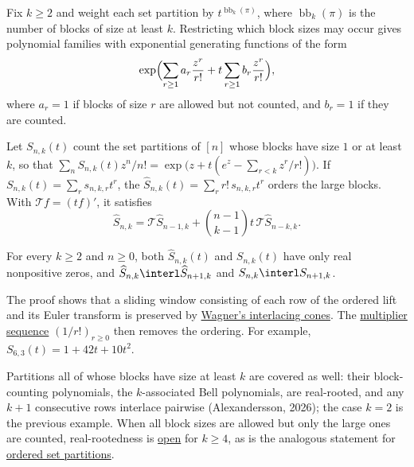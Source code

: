 \begin{example*}\label{bigBlockSetPartitions}
Fix $k\geq2$ and weight each set partition by $t^{\operatorname{bb}_k(\pi)}$, where
$\operatorname{bb}_k(\pi)$ is the number of blocks of size at least $k$.  Restricting which
block sizes may occur gives polynomial families with exponential generating
functions of the form
\[
  \exp\Bigl(\sum_{r\geq1}a_r\frac{z^r}{r!}+t\sum_{r\geq1}b_r\frac{z^r}{r!}\Bigr),
\]
where $a_r=1$ if blocks of size $r$ are allowed but not counted, and $b_r=1$
if they are counted.

Let $S_{n,k}(t)$ count the set partitions of $[n]$ whose blocks have size $1$
or at least $k$, so that
$\sum_n S_{n,k}(t)z^n/n!=\exp\bigl(z+t(e^z-\sum_{r<k}z^r/r!)\bigr)$.  If
$S_{n,k}(t)=\sum_r s_{n,k,r}t^r$, the 
$\widehat S_{n,k}(t)=\sum_r r!\,s_{n,k,r}t^r$ orders the large blocks.
With $\mathcal{T}f=(tf)'$, it satisfies
\[
  \widehat S_{n,k}
  =\mathcal{T}\widehat S_{n-1,k}
  +\binom{n-1}{k-1}t\,\mathcal{T}\widehat S_{n-k,k}.
\]

\begin{theorem}[Alexandersson, 2026]
For every $k\geq2$ and $n\geq0$, both $\widehat S_{n,k}(t)$ and $S_{n,k}(t)$
have only real nonpositive zeros, and
$\widehat S_{n,k}\interl\widehat S_{n+1,k}$ and
$S_{n,k}\interl S_{n+1,k}$.
\end{theorem}

The proof shows that a sliding window consisting of each row of the ordered
lift and its Euler transform is preserved by
\hyperref[interlacingPolynomials]{Wagner's interlacing cones}.  The
\hyperref[multiplierSequences]{multiplier sequence} $(1/r!)_{r\geq0}$ then
removes the ordering.  For example,
$S_{6,3}(t)=1+42t+10t^2$.

Partitions all of whose blocks have size at least $k$ are covered as well:
their block-counting polynomials, the $k$-associated Bell polynomials, are
real-rooted, and any $k+1$ consecutive rows interlace pairwise
(Alexandersson, 2026); the case $k=2$ is the previous example.  When all
block sizes are allowed but only the large ones are counted, real-rootedness
is \hyperref[conjBigBlocks]{open} for $k\geq4$, as is the analogous statement
for \hyperref[conjOrderedBigBlocks]{ordered set partitions}.
\end{example*}


